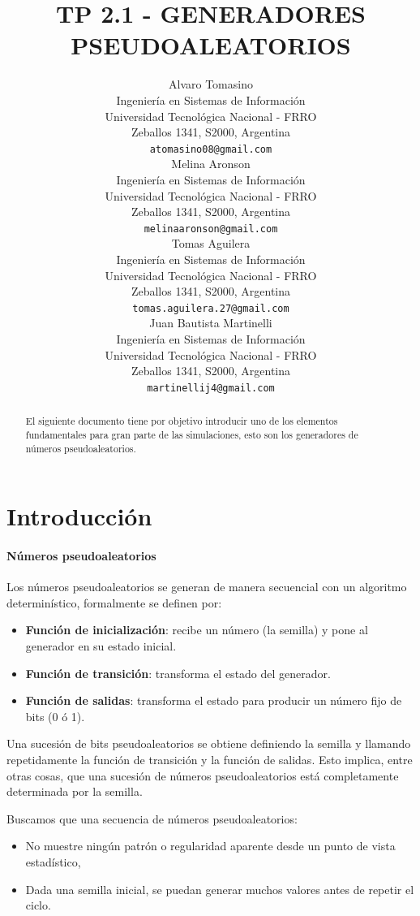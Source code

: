 \documentclass{article}
\title{TP 2.1 - GENERADORES PSEUDOALEATORIOS}
\author{
    Alvaro Tomasino \\
    Ingeniería en Sistemas de Información\\
    Universidad Tecnológica Nacional - FRRO\\
    Zeballos 1341, S2000, Argentina\\
    \texttt{atomasino08@gmail.com} \\
\And
    Melina Aronson \\
    Ingeniería en Sistemas de Información\\
    Universidad Tecnológica Nacional - FRRO\\
    Zeballos 1341, S2000, Argentina\\
    \texttt{melinaaronson@gmail.com} \\
\And
    Tomas Aguilera \\
    Ingeniería en Sistemas de Información\\
    Universidad Tecnológica Nacional - FRRO\\
    Zeballos 1341, S2000, Argentina\\
    \texttt{tomas.aguilera.27@gmail.com} \\
\And
    Juan Bautista Martinelli \\
    Ingeniería en Sistemas de Información\\
    Universidad Tecnológica Nacional - FRRO\\
    Zeballos 1341, S2000, Argentina\\
    \texttt{martinellij4@gmail.com} \\
}
\begin{document}
\maketitle




\begin{abstract}
  El siguiente documento tiene por objetivo introducir uno de los elementos fundamentales para gran parte de las simulaciones, esto son los generadores de números pseudoaleatorios.
\end{abstract}







\section{Introducción}

\paragraph{Números pseudoaleatorios} Los números pseudoaleatorios se generan de manera secuencial con un algoritmo determinístico, formalmente se definen por:

\begin{itemize}
  \item \textbf{Función de inicialización}: recibe un número (la semilla) y pone al generador en su estado inicial.
  \item \textbf{Función de transición}: transforma el estado del generador.
  \item \textbf{Función de salidas}: transforma el estado para producir un número fijo de bits (0 ó 1).
\end{itemize}

Una sucesión de bits pseudoaleatorios se obtiene definiendo la semilla y llamando repetidamente la función de transición y la función de salidas. Esto implica, entre otras cosas, que una sucesión de números pseudoaleatorios está completamente determinada por la semilla.

Buscamos que una secuencia de números pseudoaleatorios:

\begin{itemize}
  \item No muestre ningún patrón o regularidad aparente desde un punto de vista estadístico,
  \item Dada una semilla inicial, se puedan generar muchos valores antes de repetir el ciclo.
\end{itemize}
\end{document}

